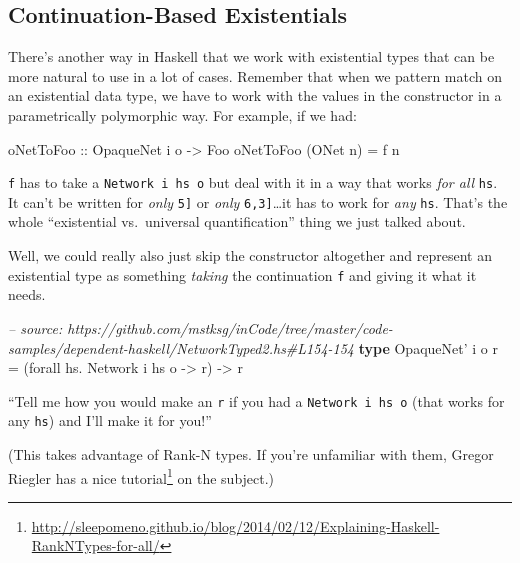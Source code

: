 \documentclass[]{article}
\newenvironment{Shaded}{\begin{snugshade}}{\end{snugshade}}
\newcommand{\CommentTok}[1]{\textcolor[rgb]{0.56,0.35,0.01}{\textit{#1}}}
\newcommand{\DataTypeTok}[1]{\textcolor[rgb]{0.13,0.29,0.53}{#1}}
\newcommand{\FunctionTok}[1]{\textcolor[rgb]{0.00,0.00,0.00}{#1}}
\newcommand{\KeywordTok}[1]{\textcolor[rgb]{0.13,0.29,0.53}{\textbf{#1}}}
\newcommand{\NormalTok}[1]{#1}
\newcommand{\OtherTok}[1]{\textcolor[rgb]{0.56,0.35,0.01}{#1}}
\renewcommand{\href}[2]{#2\footnote{\url{#1}}}
\begin{document}
\hypertarget{continuation-based-existentials}{%
\subsection{Continuation-Based
Existentials}\label{continuation-based-existentials}}

There's another way in Haskell that we work with existential types that can be
more natural to use in a lot of cases. Remember that when we pattern match on an
existential data type, we have to work with the values in the constructor in a
parametrically polymorphic way. For example, if we had:

\begin{Shaded}
\begin{Highlighting}[]
\OtherTok{oNetToFoo ::} \DataTypeTok{OpaqueNet}\NormalTok{ i o }\OtherTok{->} \DataTypeTok{Foo}
\NormalTok{oNetToFoo (}\DataTypeTok{ONet}\NormalTok{ n) }\FunctionTok{=}\NormalTok{ f n}
\end{Highlighting}
\end{Shaded}

\texttt{f} has to take a \texttt{Network\ i\ hs\ o} but deal with it in a way
that works \emph{for all} \texttt{hs}. It can't be written for \emph{only}
\texttt{\textquotesingle{}{[}5{]}} or \emph{only}
\texttt{\textquotesingle{}{[}6,3{]}}\ldots{}it has to work for \emph{any}
\texttt{hs}. That's the whole ``existential vs.~universal quantification'' thing
we just talked about.

Well, we could really also just skip the constructor altogether and represent an
existential type as something \emph{taking} the continuation \texttt{f} and
giving it what it needs.

\begin{Shaded}
\begin{Highlighting}[]
\CommentTok{-- source: https://github.com/mstksg/inCode/tree/master/code-samples/dependent-haskell/NetworkTyped2.hs#L154-154}
\KeywordTok{type} \DataTypeTok{OpaqueNet'}\NormalTok{ i o r }\FunctionTok{=}\NormalTok{ (forall hs}\FunctionTok{.} \DataTypeTok{Network}\NormalTok{ i hs o }\OtherTok{->}\NormalTok{ r) }\OtherTok{->}\NormalTok{ r}
\end{Highlighting}
\end{Shaded}

``Tell me how you would make an \texttt{r} if you had a
\texttt{Network\ i\ hs\ o} (that works for any \texttt{hs}) and I'll make it for
you!''

(This takes advantage of Rank-N types. If you're unfamiliar with them, Gregor
Riegler has a
\href{http://sleepomeno.github.io/blog/2014/02/12/Explaining-Haskell-RankNTypes-for-all/}{nice
tutorial} on the subject.)
\end{document}
